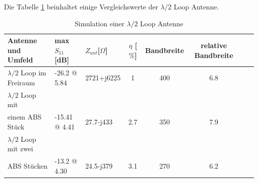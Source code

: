 
Die Tabelle \ref{tab:Evaluation_Vergeich_Loop_Antennen_Lmabda05} beinhaltet einige Vergleichswerte der $\lambda/2$ Loop Antenne.
\begin{table}[!h]
 \centering
 \begin{tabular}{p{4cm} p{2cm} l c c c c r} 
 \toprule 
 Antenne und Umfeld 	& max $S_{11}$[dB]		& $Z_{ant}$[$\Omega$] 	& $\eta$ [$\%$] & Bandbreite & relative Bandbreite\\ 
 \midrule
 $\lambda/2$ Loop im Freiraum 		&	-26.2 @ 5.84	& 	2721+j6225			& 1	&	400 & 6.8\\ 					 		
$\lambda/2$ Loop mit \\einem ABS Stück & -15.41 @ 4.41 	&	27.7-j433		&	2.7	&	350 & 7.9 \\
$\lambda/2$ Loop mit zwei \\ABS Stücken & -13.2 @ 4.30 &	24.5-j379		&	3.1	&	270 & 6.2\\
 \bottomrule
 \end{tabular}
 \caption{Simulation einer $\lambda/2$ Loop Antenne }
 \label{tab:Evaluation_Vergeich_Loop_Antennen_Lmabda05}
\end{table}

